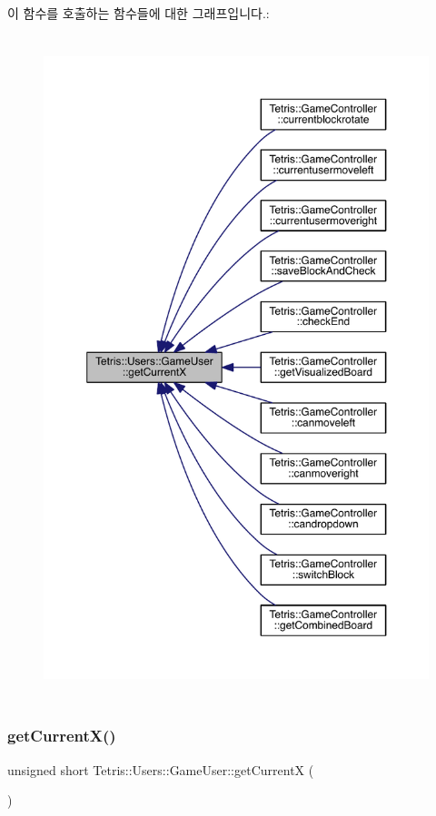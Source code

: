 이 함수를 호출하는 함수들에 대한 그래프입니다.\+:
\nopagebreak
\begin{figure}[H]
\begin{center}
\leavevmode
\includegraphics[height=550pt]{class_tetris_1_1_users_1_1_game_user_ad25eace96bd27ae6df4a0c0d506be730_icgraph}
\end{center}
\end{figure}
\mbox{\label{class_tetris_1_1_users_1_1_game_user_ad25eace96bd27ae6df4a0c0d506be730}} 
\subsubsection{\texorpdfstring{get\+Current\+X()}{getCurrentX()}\hspace{0.1cm}{\footnotesize\ttfamily [2/2]}}
{\footnotesize\ttfamily unsigned short Tetris\+::\+Users\+::\+Game\+User\+::get\+CurrentX (\begin{DoxyParamCaption}{ }\end{DoxyParamCaption})\hspace{0.3cm}{\ttfamily [inline]}}

